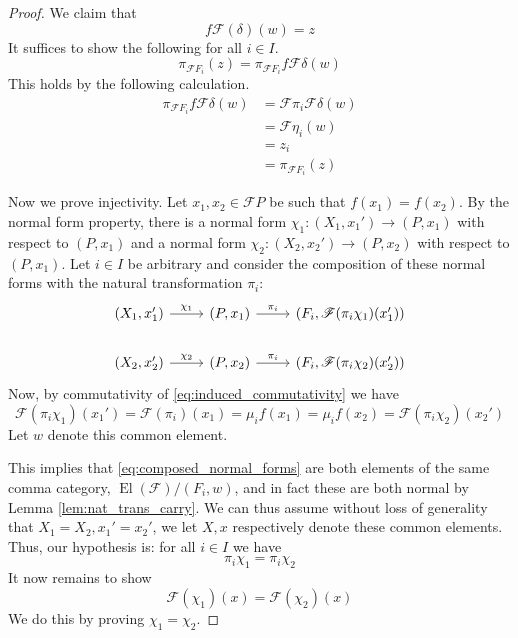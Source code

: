 \documentclass[12pt]{article}
\theoremstyle{plain}
\theoremstyle{definition}
\newcommand{\scr}[1]{\mathscr{#1}}
\newcommand{\lto}{\longrightarrow}
\begin{document}
\begin{proof}
		We claim that
		\begin{equation}
			f\scr{F}(\delta)(w) = z
			\end{equation}
		It suffices to show the following for all $i \in I$.
		\begin{equation}
			\pi_{\scr{F}F_i}(z) = \pi_{\scr{F}F_i}f\scr{F}\delta(w)
			\end{equation}
		This holds by the following calculation.
		\begin{align}
			\pi_{\scr{F}F_i}f\scr{F}\delta(w) &= \scr{F}\pi_i \scr{F} \delta(w)\\
			&= \scr{F}\eta_i(w)\\
			&= z_i\\
			&= \pi_{\scr{F}F_i}(z)
			\end{align}
		
		Now we prove injectivity. Let $x_1,x_2 \in \scr{F}P$ be such that $f(x_1) = f(x_2)$. By the normal form property, there is a normal form $\chi_1: (X_1, x_1') \lto (P, x_1)$ with respect to $(P,x_1)$ and a normal form $\chi_2: (X_2, x_2') \lto (P, x_2)$ with respect to $(P,x_1)$. Let $i \in I$ be arbitrary and consider the composition of these normal forms with the natural transformation $\pi_i$:
		\begin{equation}\label{eq:composed_normal_forms}
			\begin{tikzcd}
				(X_1,x_1')\arrow[r,"{\chi_1}"] & (P, x_1)\arrow[r,"{\pi_i}"] & (F_i, \scr{F}(\pi_i \chi_1)(x_1'))\\
				(X_2,x_2')\arrow[r,"{\chi_2}"] & (P, x_2)\arrow[r,"{\pi_i}"] & (F_i, \scr{F}(\pi_i \chi_2)(x_2'))
				\end{tikzcd}
			\end{equation}
		Now, by commutativity of \eqref{eq:induced_commutativity} we have
		\begin{equation}
			\scr{F}(\pi_i \chi_1)(x_1') = \scr{F}(\pi_i)(x_1) = \mu_i f(x_1) = \mu_if(x_2) = \scr{F}(\pi_i \chi_2)(x_2')
			\end{equation}
		Let $w$ denote this common element.
		
		This implies that \eqref{eq:composed_normal_forms} are both elements of the same comma category, $\operatorname{El}(\scr{F})/(F_i, w)$, and in fact these are both normal by Lemma \ref{lem:nat_trans_carry}. We can thus assume without loss of generality that $X_1 = X_2, x_1' = x_2'$, we let $X,x$ respectively denote these common elements. Thus, our hypothesis is: for all $i \in I$ we have
		\begin{equation}\label{eq:epi_would_be_nice}
			\pi_i\chi_1 = \pi_i\chi_2
			\end{equation}
		It now remains to show 
		\begin{equation}
			\scr{F}(\chi_1)(x) = \scr{F}(\chi_2)(x)
			\end{equation}
		We do this by proving $\chi_1 = \chi_2$.
		

\end{proof}
\end{document}
